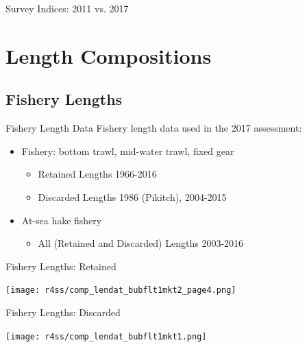 \documentclass[pdf]{beamer}\usepackage[]{graphicx}\usepackage[]{color}
\begin{document}
\begin{frame}{Survey Indices: 2011 vs. 2017}

\end{frame}

\section{Length Compositions}
\subsection{Fishery Lengths}
\begin{frame}{Fishery Length Data}
  Fishery length data used in the 2017 assessment:
  \begin{itemize}
    \item Fishery: bottom trawl, mid-water trawl, fixed gear
      \begin{itemize}
        \item Retained Lengths 1966-2016
        \item Discarded Lengths 1986 (Pikitch), 2004-2015
      \end{itemize}
    \item At-sea hake fishery
      \begin{itemize}
        \item All (Retained and Discarded) Lengths 2003-2016
      \end{itemize}
  \end{itemize}
\end{frame}

\begin{frame}{Fishery Lengths: Retained}
  \begin{center}
    \texttt{[image: r4ss/comp\_lendat\_bubflt1mkt2\_page4.png]}
  \end{center}
\end{frame}

\begin{frame}{Fishery Lengths: Discarded}
  \begin{center}
    \texttt{[image: r4ss/comp\_lendat\_bubflt1mkt1.png]}
  \end{center}
\end{frame}
\end{document}
